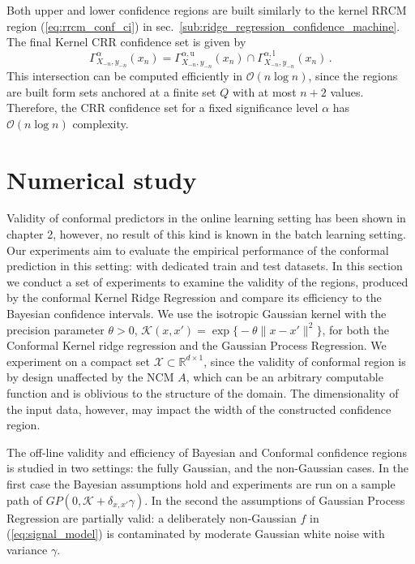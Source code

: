 \documentclass[10pt, conference, compsocconf]{IEEEtran}
\newcommand{\Kcal}{\mathcal{K}}
\newcommand{\BigO}{\mathcal{O}}
\newcommand{\Xcal}{\mathcal{X}}
\newcommand{\Real}{\mathbb{R}}
\begin{document}
Both upper and lower confidence regions are built similarly to the kernel RRCM region
(\ref{eq:rrcm_conf_ci}) in sec.~\ref{sub:ridge_regression_confidence_machine}. The
final Kernel CRR confidence set is given by
\begin{equation} \label{eq:crr_conf_ci}
  \Gamma_{X_{-n}, y_{-n}}^\alpha(x_n)
    = \Gamma_{X_{-n}, y_{-n}}^{\alpha,\text{u}}(x_n)
    \cap \Gamma_{X_{-n}, y_{-n}}^{\alpha,\text{l}}(x_n)
    \,.
\end{equation}
This intersection can be computed efficiently in $\BigO(n \log{} n)$, since the regions
are built form sets anchored at a finite set $Q$ with at most $n+2$ values. Therefore,
the CRR confidence set for a fixed significance level $\alpha$ has $\BigO(n\log{} n)$
complexity.



\section{Numerical study} %
\label{sec:numerical_study}

Validity of conformal predictors in the online learning setting has been shown in
\cite{vovk2005} chapter 2, however, no result of this kind is known in the batch
learning setting. Our experiments aim to evaluate the empirical performance of the
conformal prediction in this setting: with dedicated train and test datasets. In
this section we conduct a set of experiments to examine the validity of the regions,
produced by the conformal Kernel Ridge Regression and compare its efficiency to
the Bayesian confidence intervals. We use the isotropic Gaussian kernel with the
precision parameter $\theta>0$, $\Kcal(x,x') = \mathop{\text{exp}}\bigl
\{-\theta \|x - x'\|^2\bigr\}$, for both the Conformal Kernel ridge regression and
the Gaussian Process Regression. We experiment on a compact set $\Xcal\subset \Real^{d\times 1}$,
since the validity of conformal region is by design unaffected by the NCM $A$, which
can be an arbitrary computable function and is oblivious to the structure of the
domain. The dimensionality of the input data, however, may impact the width of
the constructed confidence region.

The off-line validity and efficiency of Bayesian and Conformal confidence regions
is studied in two settings: the fully Gaussian, and the non-Gaussian cases. In the
first case the Bayesian assumptions hold and experiments are run on a sample path
of $GP(0, \Kcal + \delta_{x,x'} \gamma)$. In the second the assumptions of Gaussian
Process Regression are partially valid: a deliberately non-Gaussian $f$ in
(\ref{eq:signal_model}) is contaminated by moderate Gaussian white noise with
variance $\gamma$.
\end{document}
